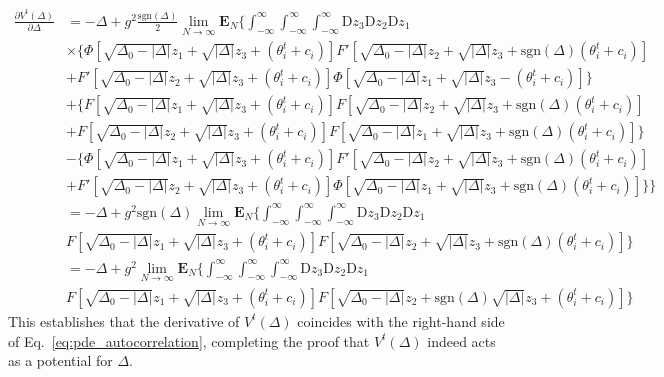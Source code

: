 \documentclass[reprint,amsmath,amssymb,aps]{revtex4-2}
\begin{document}
\begin{align*}
    \frac{\partial V^t(\Delta)}{\partial \Delta}
    &=
    -\Delta+ g^2\frac{\mathrm{sgn}(\Delta)}{2} \lim_{N\to\infty} \mathbf{E}_{N} \Bigg\{ \int_{-\infty}^{\infty} \int_{-\infty}^{\infty} \int_{-\infty}^{\infty} \mathrm{D}z_3 \mathrm{D}z_2 \mathrm{D}z_1\\
    &\times
    \Bigg\{ \Phi\left[ \sqrt{\Delta_0 - |\Delta|} z_1 + \sqrt{|\Delta|}z_3 + (\theta_i^t + c_i)\right] F'\left[ \sqrt{\Delta_0 - |\Delta|} z_2 + \sqrt{|\Delta|}z_3 + \mathrm{sgn}(\Delta) (\theta_i^t + c_i)\right] \\
    & +
    F'\left[ \sqrt{\Delta_0 - |\Delta|} z_2 + \sqrt{|\Delta|}z_3 + (\theta_i^t + c_i)\right] \Phi\left[ \sqrt{\Delta_0 - |\Delta|} z_1 + \sqrt{|\Delta|}z_3 - (\theta_i^t + c_i)\right] \Bigg\} \\
    &+
    \Bigg\{ F\left[ \sqrt{\Delta_0 - |\Delta|} z_1 + \sqrt{|\Delta|}z_3 + (\theta_i^t + c_i)\right] F\left[ \sqrt{\Delta_0 - |\Delta|} z_2 + \sqrt{|\Delta|}z_3 + \mathrm{sgn}(\Delta)(\theta_i^t + c_i)\right] \\
    &+
    F\left[ \sqrt{\Delta_0 - |\Delta|} z_2 + \sqrt{|\Delta|}z_3 + (\theta_i^t + c_i)\right] F\left[ \sqrt{\Delta_0 - |\Delta|} z_1 + \sqrt{|\Delta|}z_3 + \mathrm{sgn}(\Delta)(\theta_i^t + c_i)\right] \Bigg\} \\
    &-
    \Bigg\{ \Phi\left[ \sqrt{\Delta_0 - |\Delta|} z_1 + \sqrt{|\Delta|}z_3 + (\theta_i^t + c_i)\right] F'\left[ \sqrt{\Delta_0 - |\Delta|} z_2 + \sqrt{|\Delta|}z_3 + \mathrm{sgn}(\Delta)(\theta_i^t + c_i)\right] \\
    &+
    F'\left[ \sqrt{\Delta_0 - |\Delta|} z_2 + \sqrt{|\Delta|}z_3 + (\theta_i^t + c_i)\right] \Phi\left[ \sqrt{\Delta_0 - |\Delta|} z_1 + \sqrt{|\Delta|}z_3 + \mathrm{sgn}(\Delta)(\theta_i^t + c_i)\right] \Bigg\} \Bigg\} \\
    &=
    -\Delta+ g^2 \mathrm{sgn}(\Delta) \lim_{N\to\infty} \mathbf{E}_{N} \Bigg\{ \int_{-\infty}^{\infty} \int_{-\infty}^{\infty} \int_{-\infty}^{\infty} \mathrm{D}z_3 \mathrm{D}z_2 \mathrm{D}z_1 \\
    &
    F\left[ \sqrt{\Delta_0 - |\Delta|} z_1 + \sqrt{|\Delta|}z_3 + (\theta_i^t + c_i)\right] F\left[ \sqrt{\Delta_0 - |\Delta|} z_2 + \sqrt{|\Delta|}z_3 + \mathrm{sgn}(\Delta)(\theta_i^t + c_i)\right] \Bigg\} \\
    &=
    -\Delta+ g^2\lim_{N\to\infty} \mathbf{E}_{N} \Bigg\{ \int_{-\infty}^{\infty} \int_{-\infty}^{\infty} \int_{-\infty}^{\infty} \mathrm{D}z_3 \mathrm{D}z_2 \mathrm{D}z_1 \\
    &
    F\left[ \sqrt{\Delta_0 - |\Delta|} z_1 + \sqrt{|\Delta|}z_3 + (\theta_i^t + c_i)\right] F\left[ \sqrt{\Delta_0 - |\Delta|} z_2 + \mathrm{sgn}(\Delta) \sqrt{|\Delta|}z_3 +(\theta_i^t + c_i)\right] \Bigg\}
\end{align*}
This establishes that the derivative of $V^t(\Delta)$ coincides with the right-hand side of Eq.~\eqref{eq:pde_autocorrelation}, completing the proof that $V^t(\Delta)$ indeed acts as a potential for $\Delta$.
\end{document}
